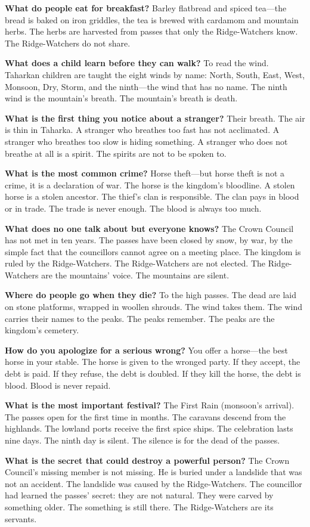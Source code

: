 \vspace{1em}

\begin{almanac}
\textbf{What do people eat for breakfast?} Barley flatbread and spiced tea---the bread is baked on iron griddles, the tea is brewed with cardamom and mountain herbs. The herbs are harvested from passes that only the Ridge-Watchers know. The Ridge-Watchers do not share.

\textbf{What does a child learn before they can walk?} To read the wind. Taharkan children are taught the eight winds by name: North, South, East, West, Monsoon, Dry, Storm, and the ninth---the wind that has no name. The ninth wind is the mountain's breath. The mountain's breath is death.

\textbf{What is the first thing you notice about a stranger?} Their breath. The air is thin in Taharka. A stranger who breathes too fast has not acclimated. A stranger who breathes too slow is hiding something. A stranger who does not breathe at all is a spirit. The spirits are not to be spoken to.

\textbf{What is the most common crime?} Horse theft---but horse theft is not a crime, it is a declaration of war. The horse is the kingdom's bloodline. A stolen horse is a stolen ancestor. The thief's clan is responsible. The clan pays in blood or in trade. The trade is never enough. The blood is always too much.

\textbf{What does no one talk about but everyone knows?} The Crown Council has not met in ten years. The passes have been closed by snow, by war, by the simple fact that the councillors cannot agree on a meeting place. The kingdom is ruled by the Ridge-Watchers. The Ridge-Watchers are not elected. The Ridge-Watchers are the mountains' voice. The mountains are silent.

\textbf{Where do people go when they die?} To the high passes. The dead are laid on stone platforms, wrapped in woollen shrouds. The wind takes them. The wind carries their names to the peaks. The peaks remember. The peaks are the kingdom's cemetery.

\textbf{How do you apologize for a serious wrong?} You offer a horse---the best horse in your stable. The horse is given to the wronged party. If they accept, the debt is paid. If they refuse, the debt is doubled. If they kill the horse, the debt is blood. Blood is never repaid.

\textbf{What is the most important festival?} The First Rain (monsoon's arrival). The passes open for the first time in months. The caravans descend from the highlands. The lowland ports receive the first spice ships. The celebration lasts nine days. The ninth day is silent. The silence is for the dead of the passes.

\textbf{What is the secret that could destroy a powerful person?} The Crown Council's missing member is not missing. He is buried under a landslide that was not an accident. The landslide was caused by the Ridge-Watchers. The councillor had learned the passes' secret: they are not natural. They were carved by something older. The something is still there. The Ridge-Watchers are its servants.
\end{almanac}

